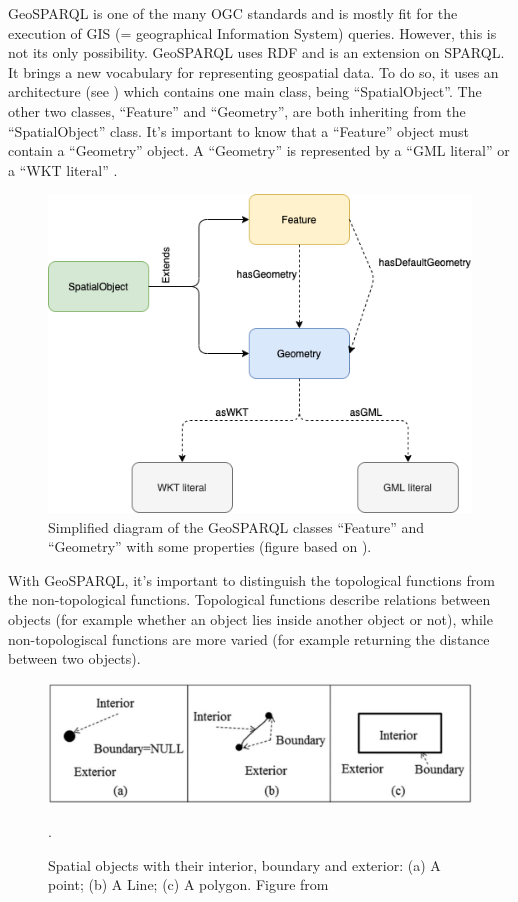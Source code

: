 \documentclass[twocolumn]{phdsymp} %
\begin{document}
GeoSPARQL is one of the many OGC standards and is mostly fit for the execution of GIS (= geographical Information System) queries. However, this is not its only possibility. GeoSPARQL uses RDF and is an extension on SPARQL. It brings a new vocabulary for representing geospatial data. To do so, it uses an architecture (see ) which contains one main class, being ``SpatialObject''. The other two classes, ``Feature'' and ``Geometry'', are both inheriting from the ``SpatialObject'' class.  It's important to know that a ``Feature'' object must contain a ``Geometry'' object. A ``Geometry'' is represented by a ``GML literal'' or a ``WKT literal'' \cite{ogcdocs}.

\begin{figure}[ht]
    \centering
    \includegraphics[width=\linewidth]{images/geosparql_architecture.png}
    \caption{Simplified diagram of the GeoSPARQL classes ``Feature'' and ``Geometry'' with some properties (figure based on \protect\cite{geosparqlsupport}).}
    \label{fig:abstr_geosparql_architecture}
\end{figure}

With GeoSPARQL, it's important to distinguish the topological functions from the non-topological functions. Topological functions describe relations between objects (for example whether an object lies inside another object or not), while non-topologiscal functions are more varied (for example returning the distance between two objects).

\begin{figure}[ht]
    \centering
    \includegraphics[width=\linewidth]{images/spatial_objects_DE-9IM.png}
    \caption{Spatial objects with their interior, boundary and exterior: (a) A point; (b) A Line; (c) A polygon. Figure from \protect\cite{shen2018classification}}.
    \label{fig:abstr_de-9im}
\end{figure}
\end{document}
